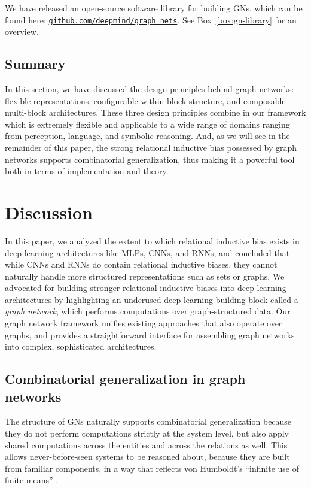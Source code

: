 We have released an open-source software library for building GNs, which can be found here: \href{https://github.com/deepmind/graph_nets}{\texttt{{github.com/deepmind/graph\_nets}}}. See Box~\ref{box:gn-library} for an overview.

\subsection{Summary}

In this section, we have discussed the design principles behind graph networks: flexible representations, configurable within-block structure, and composable multi-block architectures.
These three design principles combine in our framework which is extremely flexible and applicable to a wide range of domains ranging from perception, language, and symbolic reasoning.
And, as we will see in the remainder of this paper, the strong relational inductive bias possessed by graph networks supports combinatorial generalization, thus making it a powerful tool both in terms of implementation and theory.

\section{Discussion}
\label{sec:discussion}

In this paper, we analyzed the extent to which relational inductive bias exists in deep learning architectures like MLPs, CNNs, and RNNs, and concluded that while CNNs and RNNs do contain relational inductive biases, they cannot naturally handle more structured representations such as sets or graphs.
We advocated for building stronger relational inductive biases into deep learning architectures by highlighting an underused deep learning building block called a \emph{graph network}, which performs computations over graph-structured data.
Our graph network framework unifies existing approaches that also operate over graphs, and provides a straightforward interface for assembling graph networks into complex, sophisticated architectures. 

\subsection{Combinatorial generalization in graph networks}
\label{sec:combinatorial-generalization}

The structure of GNs naturally supports combinatorial generalization because they do not perform computations strictly at the system level, but also apply shared computations across the entities and across the relations as well. This allows never-before-seen systems to be reasoned about, because they are built from familiar components, in a way that reflects von Humboldt's ``infinite use of finite means'' \citep{humboldt1999language,chomsky2014aspects}.


